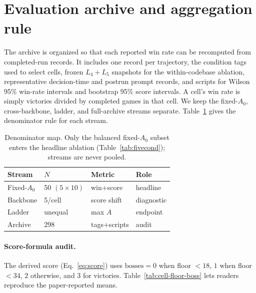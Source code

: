 
\section{Evaluation archive and aggregation rule}
\label{app:configs}

The archive is organized so that each reported win rate can be
recomputed from completed-run records. It includes one record per
trajectory, the condition tags used to select cells, frozen $L_4{+}L_5$
snapshots for the within-codebase ablation, representative
decision-time and postrun prompt records, and scripts for Wilson 95\%
win-rate intervals and bootstrap 95\% score intervals. A cell's win
rate is simply victories divided by completed games in that cell. We
keep the fixed-$A_0$, cross-backbone, ladder, and full-archive
streams separate. Table~\ref{tab:evidence-streams} gives the
denominator rule for each stream.

\begin{table}[H]
\centering\footnotesize
\caption{Denominator map. Only the balanced fixed-$A_0$ subset enters the headline ablation (Table~\ref{tab:fivecond}); streams are never pooled.}
\label{tab:evidence-streams}
\setlength{\tabcolsep}{4pt}
\renewcommand{\arraystretch}{1.08}
\begin{tabular*}{\columnwidth}{@{\extracolsep{\fill}}llll@{}}
\toprule
Stream & $N$ & Metric & Role \\
\midrule
Fixed-$A_0$ & 50 $(5\!\times\!10)$ & win+score & headline \\
Backbone & 5/cell & score shift & diagnostic \\
Ladder & unequal & max $A$ & endpoint \\
Archive & 298 & tags+scripts & audit \\
\bottomrule
\end{tabular*}
\end{table}
\FloatBarrier

\paragraph{Score-formula audit.}
The derived score (Eq.~\ref{eq:score}) uses $\mathrm{bosses}=0$
when floor $<18$, $1$ when floor $<34$, $2$ otherwise, and $3$
for victories. Table~\ref{tab:cell-floor-boss} lets readers
reproduce the paper-reported means.

